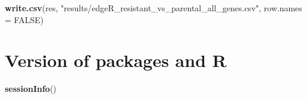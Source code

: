 \documentclass[
]{book}
\newenvironment{Shaded}{\begin{snugshade}}{\end{snugshade}}
\newcommand{\AttributeTok}[1]{\textcolor[rgb]{0.13,0.29,0.53}{#1}}
\newcommand{\ConstantTok}[1]{\textcolor[rgb]{0.56,0.35,0.01}{#1}}
\newcommand{\FunctionTok}[1]{\textcolor[rgb]{0.13,0.29,0.53}{\textbf{#1}}}
\newcommand{\NormalTok}[1]{#1}
\newcommand{\StringTok}[1]{\textcolor[rgb]{0.31,0.60,0.02}{#1}}
\begin{document}
\begin{Shaded}
\begin{Highlighting}[]
\FunctionTok{write.csv}\NormalTok{(res, }\StringTok{"results/edgeR\_resistant\_vs\_parental\_all\_genes.csv"}\NormalTok{, }\AttributeTok{row.names =} \ConstantTok{FALSE}\NormalTok{)}
\end{Highlighting}
\end{Shaded}

\section{Version of packages and R}\label{version-of-packages-and-r}

\begin{Shaded}
\begin{Highlighting}[]
\FunctionTok{sessionInfo}\NormalTok{()}
\end{Highlighting}
\end{Shaded}
\end{document}

